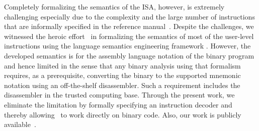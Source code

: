 \documentclass[a4paper,UKenglish,cleveref, autoref]{lipics-v2019}
\begin{document}
Completely formalizing the semantics of the \ISA ISA, however, is extremely
challenging especially due to the complexity and the large number of
instructions that are informally specified in the reference manual~\cite{IntelManual}.
Despite the challenges, we witnessed the heroic effort~\cite{Dasgupta:2019} in
formalizing the semantics of most of the user-level instructions using the language
semantics engineering framework \K. However, the developed semantics is for the
assembly language notation of the binary program and hence limited in the sense
that any binary analysis using that formalism requires, as a prerequisite,
     converting the binary to the supported mnemonic notation using an
     off-the-shelf disassembler. Such a requirement includes the disassembler in
     the trusted computing base. Through the present work, we eliminate the
     limitation by formally specifying an instruction decoder and thereby
     allowing~\cite{Dasgupta:2019} to work directly on binary code. Also, our work is publicly available~\cite{x86-64-decoder-github}.






\end{document}
